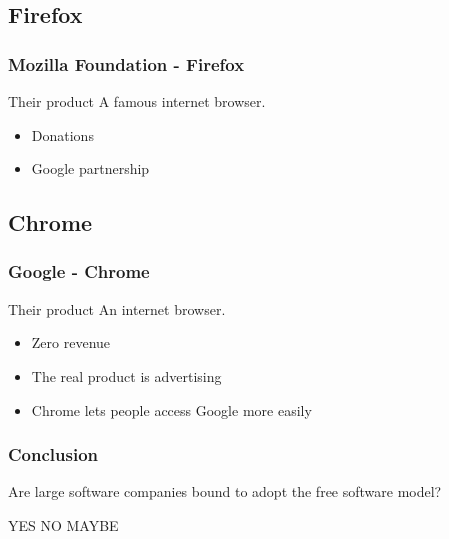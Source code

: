 \documentclass{beamer}
\begin{document}
\subsection{Firefox}

\begin{frame}

  \frametitle{Mozilla Foundation - Firefox}

  \begin{block}{Their product}
    A famous internet browser.
  \end{block}

  \vfill

  \begin{itemize}
    \item<2->{Donations}
    \item<3>{Google partnership}
  \end{itemize}

\end{frame}

\subsection{Chrome}

\begin{frame}

  \frametitle{Google - Chrome}

  \begin{block}{Their product}
    An internet browser.
  \end{block}

  \vfill

  \begin{itemize}
    \item<2->{Zero revenue}
    \item<3->{The real product is advertising}
    \item<4>{Chrome lets people access Google more easily}
  \end{itemize}

\end{frame}

\begin{frame}

  \frametitle{Conclusion}

  \begin{block}{}
    \begin{center}Are large software companies bound to adopt the free software
    model?\end{center}
  \end{block}

  YES NO MAYBE

\end{frame}
\end{document}
